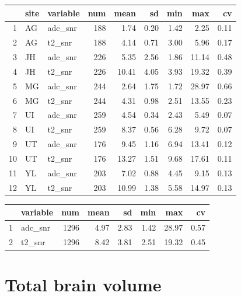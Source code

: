\documentclass[
]{article}
\begin{document}
\begin{table}[ht]
\centering
\begin{tabular}{rllrrrrrr}
  \hline
 & site & variable & num & mean & sd & min & max & cv \\ 
  \hline
1 & AG & adc\_snr & 188 & 1.74 & 0.20 & 1.42 & 2.25 & 0.11 \\ 
  2 & AG & t2\_snr & 188 & 4.14 & 0.71 & 3.00 & 5.96 & 0.17 \\ 
  3 & JH & adc\_snr & 226 & 5.35 & 2.56 & 1.86 & 11.14 & 0.48 \\ 
  4 & JH & t2\_snr & 226 & 10.41 & 4.05 & 3.93 & 19.32 & 0.39 \\ 
  5 & MG & adc\_snr & 244 & 2.64 & 1.75 & 1.72 & 28.97 & 0.66 \\ 
  6 & MG & t2\_snr & 244 & 4.31 & 0.98 & 2.51 & 13.55 & 0.23 \\ 
  7 & UI & adc\_snr & 259 & 4.54 & 0.34 & 2.43 & 5.49 & 0.07 \\ 
  8 & UI & t2\_snr & 259 & 8.37 & 0.56 & 6.28 & 9.72 & 0.07 \\ 
  9 & UT & adc\_snr & 176 & 9.45 & 1.16 & 6.94 & 13.41 & 0.12 \\ 
  10 & UT & t2\_snr & 176 & 13.27 & 1.51 & 9.68 & 17.61 & 0.11 \\ 
  11 & YL & adc\_snr & 203 & 7.02 & 0.88 & 4.45 & 9.15 & 0.13 \\ 
  12 & YL & t2\_snr & 203 & 10.99 & 1.38 & 5.58 & 14.97 & 0.13 \\ 
   \hline
\end{tabular}
\end{table}
\begin{table}[ht]
\centering
\begin{tabular}{rlrrrrrr}
  \hline
 & variable & num & mean & sd & min & max & cv \\ 
  \hline
1 & adc\_snr & 1296 & 4.97 & 2.83 & 1.42 & 28.97 & 0.57 \\ 
  2 & t2\_snr & 1296 & 8.42 & 3.81 & 2.51 & 19.32 & 0.45 \\ 
   \hline
\end{tabular}
\end{table}

\hypertarget{total-brain-volume}{%
\section{Total brain volume}\label{total-brain-volume}}
\end{document}
